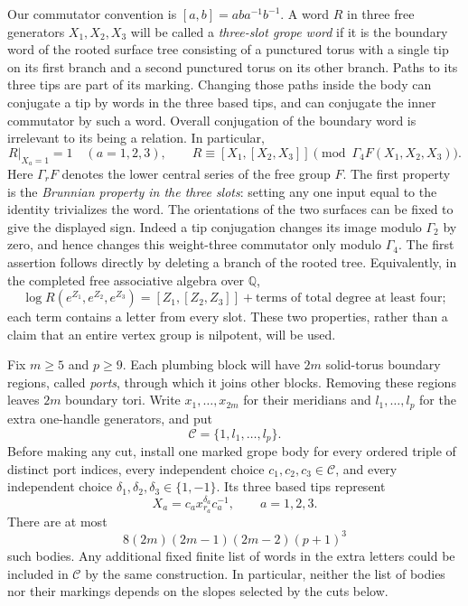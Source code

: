 Our commutator convention is \([a,b]=aba^{-1}b^{-1}\).
A word \(R\) in three free generators \(X_1,X_2,X_3\) will be called a
\emph{three-slot grope word} if it is the boundary word of the rooted surface
tree consisting of a punctured torus with a single tip on its first branch
and a second punctured torus on its other branch. Paths to its three tips
are part of its marking. Changing those paths inside the body can conjugate
a tip by words in the three based tips, and can conjugate the inner
commutator by such a word. Overall conjugation of the boundary word is
irrelevant to its being a relation. In particular,
\begin{equation}
\label{eq:grope-word-properties}
 \left.R\right|_{X_a=1}=1\quad(a=1,2,3),
 \qquad
 R\equiv[X_1,[X_2,X_3]]
       \pmod{\Gamma_4F(X_1,X_2,X_3)}.
\end{equation}
Here \(\Gamma_rF\) denotes the lower central series of the free group \(F\).
The first property is the \emph{Brunnian property in the three slots}:
setting any one input equal to the identity trivializes the word.
The orientations of the two surfaces can be fixed to give the displayed
sign. Indeed a tip conjugation changes its image modulo \(\Gamma_2\)
by zero, and hence changes this weight-three commutator only modulo
\(\Gamma_4\). The first assertion follows directly by deleting a branch
of the rooted tree. Equivalently, in the completed free associative algebra
over \(\mathbb Q\),
\begin{equation}
\label{eq:grope-word-leading}
 \log R(e^{Z_1},e^{Z_2},e^{Z_3})
   =[Z_1,[Z_2,Z_3]]+\text{terms of total degree at least four};
\end{equation}
each term contains a letter from every slot. These two properties,
rather than a claim that an entire vertex group is nilpotent, will be used.

Fix \(m\geq5\) and \(p\geq9\). Each plumbing block will have \(2m\)
solid-torus boundary regions, called \emph{ports}, through which it
joins other blocks. Removing these regions leaves \(2m\) boundary
tori. Write \(x_1,\ldots,x_{2m}\) for their meridians and
\(l_1,\ldots,l_p\) for the extra one-handle generators, and put
\[
 \mathcal C=\{1,l_1,\ldots,l_p\}.
\]
Before making any cut, install one marked grope body for every ordered
triple of distinct port indices, every independent choice
\(c_1,c_2,c_3\in\mathcal C\), and every independent choice
\(\delta_1,\delta_2,\delta_3\in\{1,-1\}\). Its three based tips represent
\begin{equation}
\label{eq:three-slot-inputs}
 X_a=c_a x_{r_a}^{\delta_a}c_a^{-1},
 \qquad a=1,2,3.
\end{equation}
There are at most
\[
 8(2m)(2m-1)(2m-2)(p+1)^3
\]
such bodies. Any additional fixed finite list of words in the extra letters
could be included in \(\mathcal C\) by the same construction.
In particular, neither the list of bodies nor their markings depends on
the slopes selected by the cuts below.

